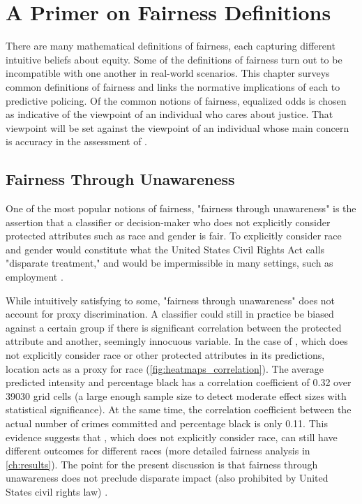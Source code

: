 \chapter{A Primer on Fairness Definitions} \label{ch:fairness_primer}

There are many mathematical definitions of fairness, each capturing different intuitive beliefs about equity. Some of the definitions of fairness turn out to be incompatible with one another in real-world scenarios. This chapter surveys common definitions of fairness and links the normative implications of each to predictive policing. Of the common notions of fairness, equalized odds is chosen as indicative of the viewpoint of an individual who cares about justice. That viewpoint will be set against the viewpoint of an individual whose main concern is accuracy in the assessment of \pp.

\section{Fairness Through Unawareness} \label{sec:fair_unaware}

One of the most popular notions of fairness, "fairness through unawareness" is the assertion that a classifier or decision-maker who does not explicitly consider protected attributes such as race and gender is fair. To explicitly consider race and gender would constitute what the United States Civil Rights Act calls "disparate treatment," and would be impermissible in many settings, such as employment \citep{barocas_big_2016}.

While intuitively satisfying to some, "fairness through unawareness" does not account for proxy discrimination. A classifier could still in practice be biased against a certain group if there is significant correlation between the protected attribute and another, seemingly innocuous variable. In the case of \pp, which does not explicitly consider race or other protected attributes in its predictions, location acts as a proxy for race (\autoref{fig:heatmaps_correlation}). The average \pp predicted intensity and percentage black has a correlation coefficient of 0.32 over 39030 grid cells (a large enough sample size to detect moderate effect sizes with statistical significance). At the same time, the correlation coefficient between the actual number of crimes committed and percentage black is only 0.11. This evidence suggests that \pp, which does not explicitly consider race, can still have different outcomes for different races (more detailed fairness analysis in \autoref{ch:results}). The point for the present discussion is that fairness through unawareness does not preclude disparate impact (also prohibited by United States civil rights law) \citep{barocas_big_2016}.

